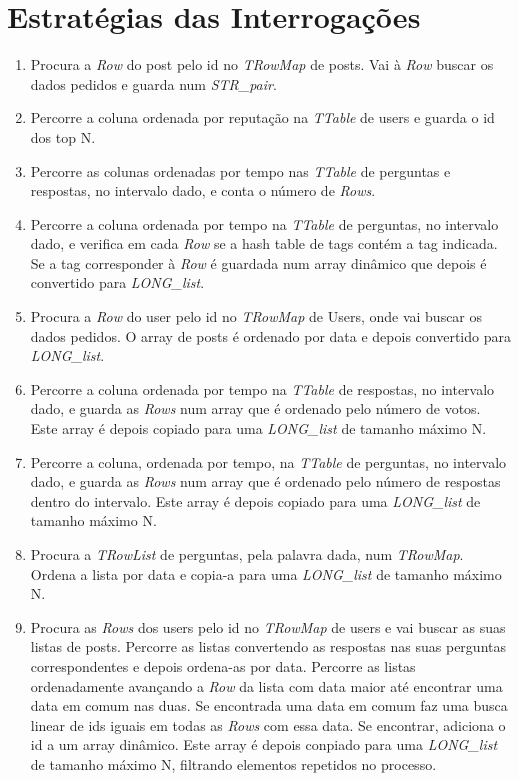 \documentclass[a4paper, 10pt]{article}
\begin{document}
\section{Estratégias das Interrogações}
\label{sec:EI}
\begin{enumerate}
	\item Procura a \emph{Row} do post pelo id no \emph{TRowMap} de posts. Vai à \emph{Row} buscar os dados pedidos e guarda num \emph{STR\_pair}.

	\item Percorre a coluna ordenada por reputação na \emph{TTable} de users e guarda o id dos top N.

	\item Percorre as colunas ordenadas por tempo nas \emph{TTable} de perguntas e respostas, no intervalo dado, e conta o número de \emph{Rows}.

	\item Percorre a coluna ordenada por tempo na \emph{TTable} de perguntas, no intervalo dado, e verifica em cada \emph{Row} se a hash table de tags contém a tag indicada.
	Se a tag corresponder à \emph{Row} é guardada num array dinâmico que depois é convertido para \emph{LONG\_list}.

	\item Procura a \emph{Row} do user pelo id no \emph{TRowMap} de Users, onde vai buscar os dados pedidos. O array de posts é ordenado por data e depois convertido para \emph{LONG\_list}.

	\item Percorre a coluna ordenada por tempo na \emph{TTable} de respostas, no intervalo dado, e guarda as \emph{Rows} num array que é ordenado pelo número de votos.
	Este array é depois copiado para uma \emph{LONG\_list} de tamanho máximo N.

	\item Percorre a coluna, ordenada por tempo, na \emph{TTable} de perguntas, no intervalo dado, e guarda as \emph{Rows} num array que é ordenado pelo número de respostas dentro do intervalo. Este array é depois copiado para uma \emph{LONG\_list} de tamanho máximo N.

	\item Procura a \emph{TRowList} de perguntas, pela palavra dada, num \emph{TRowMap}. Ordena a lista por data e copia-a para uma \emph{LONG\_list} de tamanho máximo N.

	\item Procura as \emph{Rows} dos users pelo id no \emph{TRowMap} de users e vai buscar as suas listas de posts. Percorre as listas convertendo as respostas nas suas perguntas correspondentes e depois ordena-as por data. Percorre as listas ordenadamente avançando a \emph{Row} da lista com data maior até encontrar uma data em comum nas duas. Se encontrada uma data em comum faz uma busca linear de ids iguais em todas as \emph{Rows} com essa data. Se encontrar, adiciona o id a um array dinâmico. Este array é depois conpiado para uma \emph{LONG\_list} de tamanho máximo N, filtrando elementos repetidos no processo.


\end{enumerate}
\end{document}
